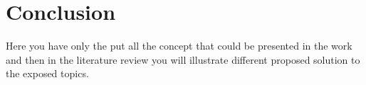 \chapter{Conclusion} \label{chapter:conclusion}

Here you have only the put all the concept that could be presented in the work and then in the literature review you will illustrate different proposed solution to the exposed topics.